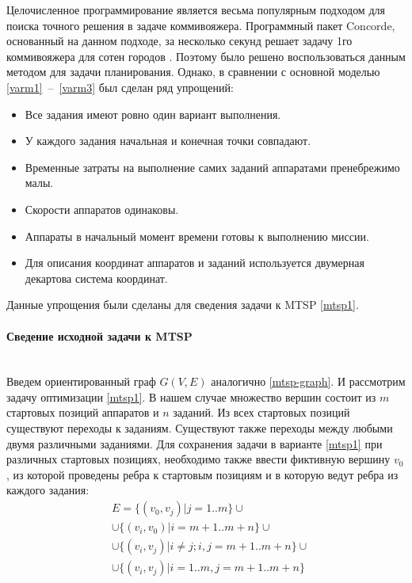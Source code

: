 \documentclass[a4paper,14pt,russian]{article}
\begin{document}
Целочисленное программирование является весьма популярным подходом для поиска точного решения в задаче коммивояжера.
Программный пакет Concorde, основанный на данном подходе, за несколько секунд решает задачу 1го коммивояжера для сотен городов \cite{applegate1999concorde}.
Поэтому было решено воспользоваться данным методом для задачи планирования. Однако, в сравнении с основной моделью \eqref{varm1}~--~\eqref{varm3} был сделан ряд упрощений:

\begin{itemize}
\item Все задания имеют ровно один вариант выполнения.
\item У каждого задания начальная и конечная точки совпадают.
\item Временные затраты на выполнение самих заданий аппаратами пренебрежимо малы.
\item Скорости аппаратов одинаковы.
\item Аппараты в начальный момент времени готовы к выполнению миссии.
\item Для описания координат аппаратов и заданий используется двумерная декартова система координат.
\end{itemize}
Данные упрощения были сделаны для сведения задачи к MTSP \eqref{mtsp1}.


\paragraph{Сведение исходной задачи к MTSP} ~\\

Введем ориентированный граф $G(V, E)$ аналогично \eqref{mtsp-graph}. И рассмотрим задачу оптимизации \eqref{mtsp1}.
В нашем случае множество вершин состоит из $m$ стартовых позиций аппаратов и $n$ заданий. Из всех стартовых позиций существуют переходы к заданиям. Существуют также переходы между любыми двумя различными заданиями. Для сохранения задачи в варианте \eqref{mtsp1} при различных стартовых позициях, необходимо также ввести фиктивную вершину $v_0$, из которой проведены ребра к стартовым позициям и в которую ведут ребра из каждого задания:
\begin{align*}
& E = \{(v_0, v_j)|j = 1..m\} \cup \\
& \cup \{(v_i, v_0) | i = m+1..m+n\} \cup  \\
& \cup \{(v_i, v_j)| i \neq j; i,j=m+1..m+n\} \cup \\
& \cup \{(v_i, v_j)| i = 1..m, j = m+1..m+n\}
\end{align*}
\end{document}
